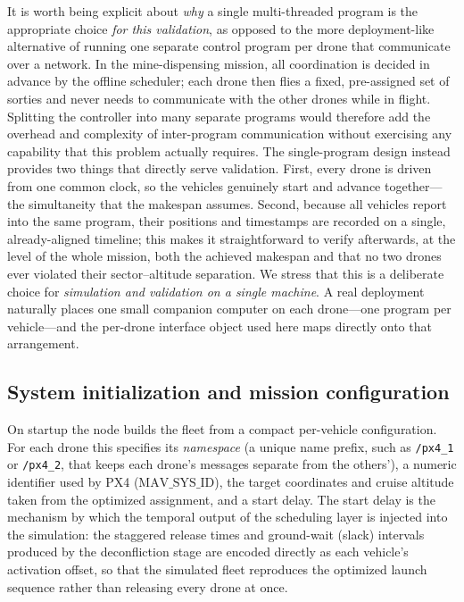 \documentclass[subscriptcorrection,upint,nolists, varvw,barcolor=Goldenrod3,mathalfa=cal=euler,balance,hyphenate,french]{asmejour} %
\begin{document}
It is worth being explicit about \emph{why} a single multi-threaded program is the appropriate choice \emph{for this validation}, as opposed to the more deployment-like alternative of running one separate control program per drone that communicate over a network. In the mine-dispensing mission, all coordination is decided in advance by the offline scheduler; each drone then flies a fixed, pre-assigned set of sorties and never needs to communicate with the other drones while in flight. Splitting the controller into many separate programs would therefore add the overhead and complexity of inter-program communication without exercising any capability that this problem actually requires. The single-program design instead provides two things that directly serve validation. First, every drone is driven from one common clock, so the vehicles genuinely start and advance together---the simultaneity that the makespan assumes. Second, because all vehicles report into the same program, their positions and timestamps are recorded on a single, already-aligned timeline; this makes it straightforward to verify afterwards, at the level of the whole mission, both the achieved makespan and that no two drones ever violated their sector--altitude separation. We stress that this is a deliberate choice for \emph{simulation and validation on a single machine}. A real deployment naturally places one small companion computer on each drone---one program per vehicle---and the per-drone interface object used here maps directly onto that arrangement.

\subsection{System initialization and mission configuration}

On startup the node builds the fleet from a compact per-vehicle configuration. For each drone this specifies its \emph{namespace} (a unique name prefix, such as \texttt{/px4\_1} or \texttt{/px4\_2}, that keeps each drone's messages separate from the others'), a numeric identifier used by PX4 ($\text{MAV\_SYS\_ID}$), the target coordinates and cruise altitude taken from the optimized assignment, and a start delay. The start delay is the mechanism by which the temporal output of the scheduling layer is injected into the simulation: the staggered release times and ground-wait (slack) intervals produced by the deconfliction stage are encoded directly as each vehicle's activation offset, so that the simulated fleet reproduces the optimized launch sequence rather than releasing every drone at once.
\end{document}
